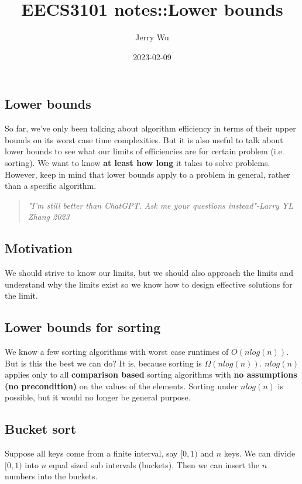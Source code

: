 \documentclass[12pt]{article}
\title{EECS3101 notes::Lower bounds}
\author{Jerry Wu}
\date{2023-02-09}
\begin{document}
\maketitle

\subsection*{Lower bounds}

So far, we've only been talking about algorithm efficiency in terms of their upper bounds on its worst case time complexities. But it is also useful to talk about lower bounds to see what our limits of efficiencies are for certain problem (i.e. sorting). We want to know \textbf{at least how long} it takes to solve problems. However, keep in mind that lower bounds apply to a problem in general, rather than a specific algorithm.

\begin{quote}
    \textit{"I'm still better than ChatGPT. Ask me your questions instead"-Larry YL Zhang 2023}
\end{quote}

\subsection*{Motivation}

We should strive to know our limits, but we should also approach the limits and understand why the limits exist so we know how to design effective solutions for the limit.

\subsection*{Lower bounds for sorting}
We know a few sorting algorithms with worst case runtimes of $O(nlog(n))$. But is this the best we can do? It is, because sorting is $\Omega(nlog(n))$. $nlog(n)$ applies only to all \textbf{comparison based} sorting algorithms with \textbf{no assumptions (no precondition)} on the values of the elements. Sorting under $nlog(n)$ is possible, but it would no longer be general purpose.

\subsection*{Bucket sort}
Suppose all keys come from a finite interval, say $[0,1)$ and $n$ keys. We can divide $[0,1)$ into $n$ equal sized sub intervals (buckets). Then we can insert the $n$ numbers into the buckets.
\end{document}
